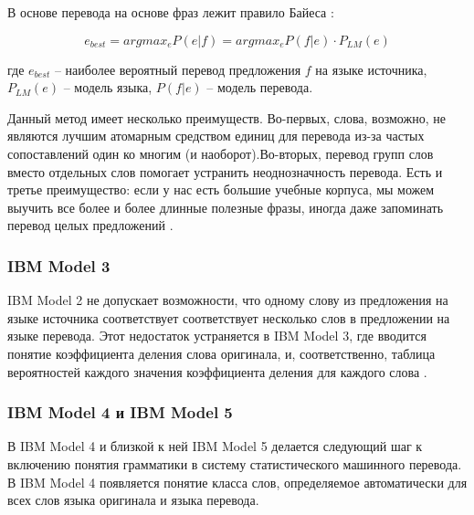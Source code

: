 В основе перевода на основе фраз лежит правило Байеса \cite{smt_book}:

\begin{equation}
	\label{eq:L}
	e_{best} = arg max_e P(e|f) = arg max_e P(f|e) \cdot P_{LM}(e)
\end{equation}

где $e_{best}$ -- наиболее вероятный перевод предложения $f$ на языке источника, $P_{LM}(e)$ -- модель языка, $P(f|e)$ -- модель перевода.

Данный метод имеет несколько преимуществ. Во-первых, слова, возможно, не являются лучшим атомарным средством единиц для перевода из-за частых сопоставлений один ко многим (и наоборот).Во-вторых, перевод групп слов вместо отдельных слов помогает устранить неоднозначность перевода. Есть и третье преимущество: если у нас есть большие учебные корпуса, мы можем выучить все более и более длинные полезные фразы, иногда даже запоминать перевод целых предложений \cite{smt_book}.

\subsubsection*{IBM Model 3}

IBM Model 2 не допускает возможности, что  одному слову из предложения на языке источника соответствует соответствует несколько слов в предложении на языке перевода. Этот недостаток устраняется в IBM Model 3, где вводится понятие коэффициента деления слова оригинала, и, соответственно, таблица вероятностей каждого значения коэффициента  деления для каждого слова \cite{smt}.

\subsubsection*{IBM Model 4 и IBM Model 5}

В IBM Model 4 и близкой к ней IBM Model 5 делается следующий шаг к включению понятия грамматики в систему статистического машинного перевода. В IBM Model 4 появляется понятие класса слов, определяемое автоматически для всех слов языка оригинала и языка перевода.